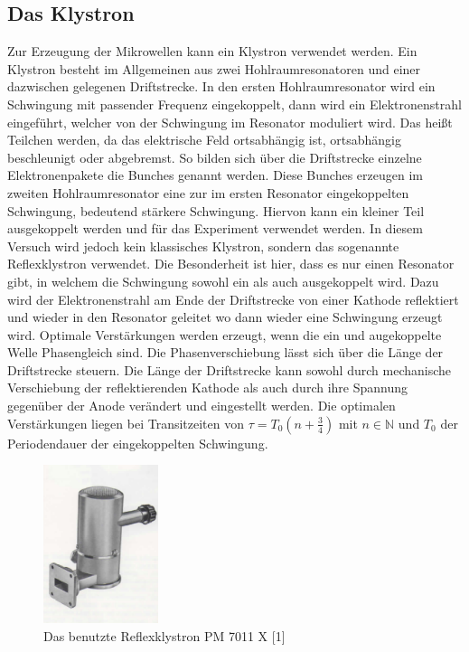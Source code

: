 \subsection{Das Klystron}
\label{sec:thklystron}
Zur Erzeugung der Mikrowellen kann ein Klystron verwendet werden. Ein Klystron besteht im Allgemeinen 
aus zwei Hohlraumresonatoren und einer dazwischen gelegenen Driftstrecke. In den ersten Hohlraumresonator 
wird ein Schwingung mit passender Frequenz eingekoppelt, dann wird ein Elektronenstrahl eingeführt, welcher 
von der Schwingung im Resonator moduliert wird. Das heißt Teilchen werden, da das elektrische Feld ortsabhängig
ist, ortsabhängig beschleunigt oder abgebremst. So bilden sich über die Driftstrecke 
einzelne Elektronenpakete die Bunches genannt werden. Diese Bunches erzeugen im zweiten Hohlraumresonator eine
zur im ersten Resonator eingekoppelten Schwingung, bedeutend stärkere Schwingung. Hiervon kann ein kleiner Teil 
ausgekoppelt werden und für das Experiment verwendet werden. In diesem Versuch wird jedoch kein klassisches
Klystron, sondern das sogenannte Reflexklystron verwendet. Die Besonderheit ist hier, dass es nur einen Resonator 
gibt, in welchem die Schwingung sowohl ein als auch ausgekoppelt wird. Dazu wird der Elektronenstrahl am Ende der 
Driftstrecke von einer Kathode reflektiert und wieder in den Resonator geleitet wo dann wieder eine Schwingung
erzeugt wird. Optimale Verstärkungen werden erzeugt, wenn die ein und augekoppelte Welle Phasengleich sind. 
Die Phasenverschiebung lässt sich über die Länge der Driftstrecke steuern. Die Länge der Driftstrecke kann 
sowohl durch mechanische Verschiebung der reflektierenden Kathode als auch durch ihre Spannung gegenüber 
der Anode verändert und eingestellt werden. Die optimalen Verstärkungen liegen bei Transitzeiten von
$\tau=T_0(n+\frac{3}{4})$ mit $n \in \mathbb{N}$ und $T_0$ der Periodendauer der eingekoppelten Schwingung.

\begin{figure}
    \centering
    \includegraphics[width=0.3\textwidth,angle=0]{content/grafiken/Klystron.PNG}
    \caption{Das benutzte Reflexklystron PM 7011 X [1]}
    \label{fig:Klystron}
  \end{figure}


